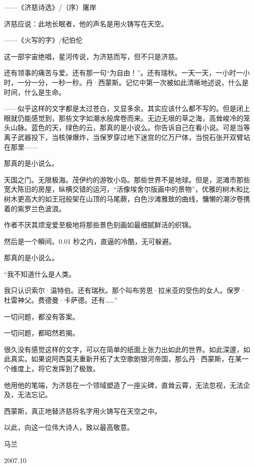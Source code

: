 \documentclass[AutoFakeBold=true]{book}
\begin{document}
——《济慈诗选》/（序）屠岸

\vspace*{1em}

{\heiti 济慈应说：此地长眠者，他的声名是用火铸写在天空。}

——《火写的字》/纪伯伦

\vspace*{1em}

这一部宇宙绝唱，星河传说，为济慈而写，但不只是济慈。

还有领事的痛苦与爱。还有那一句``为自由！''。还有瑞秋。一天一天，一小时一小时，一分一分，一秒一秒。丹·西蒙斯。记忆中第一次被如此清晰地述说，什么是时间，什么是生命。

——似乎这样的文字都是太过苍白，又显多余。其实应该什么都不写的。但是闭上眼就仍能感觉到，那些文字如潮水般席卷而来。无边无垠的草之海，高耸峻冷的笼头山脉。蓝色的天，绿色的云，那真的是小说么。你告诉自己在看小说。可是当等离子武器投下，当核弹爆炸，当保罗穿过地下迷宫的亿万尸体，当悦石张开双臂站在那里——

那真的是小说么。

天国之门。无限极海。茂伊约的游牧小岛。那些世界不是地球。但是，泥滩市那些宽大陈旧的房屋，纵横交错的运河，``活像埃舍尔版画中的景物''，优雅的树木和比树木更高大的如王冠般架在山顶的马尾蕨，白色沙滩雅致的曲线，慵懒的潮汐卷携着的紫罗兰色波浪。

作者不厌其烦宠爱至极地将那些景色刻画如最细腻鲜活的织锦。

然后是一个瞬间。0.01 秒之内，直逼的冷酷，无可躲避。

那真的是小说么。

\vspace*{1em}

``我不知道什么是人类。

我只认识索尔·温特伯。还有瑞秋。那个叫布劳恩·拉米亚的受伤的女人。保罗·杜雷神父。费德曼·卡萨德。还有……''

\vspace*{1em}

一切问题，都没有答案。

一切问题，都昭然若揭。

\vspace*{1em}

很久没有感觉这样的文字，可以在简单的纸面上张力出如此的世界。如此深邃，如此真实。如果说阿西莫夫重新开拓了太空歌剧银河帝国，那么丹·西蒙斯，在某一个维度上，将它发挥到了极致。

他用他的笔端，为济慈在一个领域塑造了一座尖碑，直耸云霄，无法忽视，无法企及，无法忘记。

\vspace*{1em}

西蒙斯，真正地替济慈将名字用火铸写在天空之中。

以此，向这一位伟大诗人，致以最高敬意。

\begin{flushright}
	马兰

	2007.10
\end{flushright}
\end{document}
